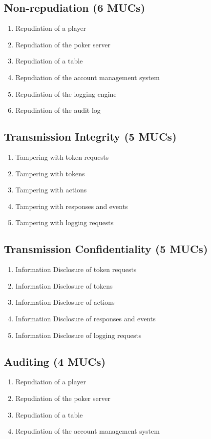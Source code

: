 \documentclass[a4paper,11pt]{report}
\begin{document}
\subsection{Non-repudiation (6 MUCs)}
\begin{enumerate}
\item Repudiation of a player
\item Repudiation of the poker server
\item Repudiation of a table
\item Repudiation of the account management system
\item Repudiation of the logging engine
\item Repudiation of the audit log
\end{enumerate}

\subsection{Transmission Integrity (5 MUCs)}
\begin{enumerate}
\item Tampering with token requests
\item Tampering with tokens
\item Tampering with actions
\item Tampering with responses and events
\item Tampering with logging requests
\end{enumerate}

\subsection{Transmission Confidentiality (5 MUCs)}
\begin{enumerate}
\item Information Disclosure of token requests
\item Information Disclosure of tokens
\item Information Disclosure of actions
\item Information Disclosure of responses and events
\item Information Disclosure of logging requests
\end{enumerate}

\subsection{Auditing (4 MUCs)}
\begin{enumerate}
\item Repudiation of a player
\item Repudiation of the poker server
\item Repudiation of a table
\item Repudiation of the account management system
\end{enumerate}
\end{document}
